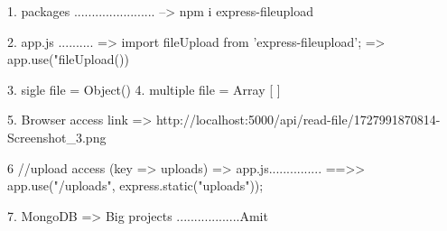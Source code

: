 1. packages .......................
   --> npm i express-fileupload

2. app.js ..........
   => import fileUpload from 'express-fileupload';
   => app.use("fileUpload())

3. sigle file = Object()
4. multiple file = Array [ ]

5. Browser access link => http://localhost:5000/api/read-file/1727991870814-Screenshot_3.png

6 //upload access (key => uploads) => app.js...............
  ==>> app.use("/uploads", express.static("uploads"));

7. MongoDB => Big projects ..................Amit